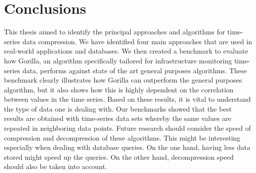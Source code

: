 \chapter*{Conclusions}
This thesis aimed to identify the principal approaches and algorithms for time-series data compression.
We have identified four main approaches that are used in real-world applications and databases.
We then created a benchmark to evaluate how Gorilla, an algorithm specifically tailored for infrastructure
monitoring time-series data, performs against state of the art general purposes algorithms. 
These benchmark clearly illustrates how Gorilla can outperform the general purposes algorithm, but it
also shows how this is highly dependent on the correlation between values in the time series.
Based on these results, it is vital to understand the type of data one is dealing with. Our benchmarks
showed that the best results are obtained with time-series data sets whereby the same values are repeated
in neighboring data points. Future research should consider the speed of compression and decompression of
these algorithms. This might be interesting especially when dealing with database queries. On the one hand,
having less data stored might speed up the queries. On the other hand, decompression speed should also
be taken into account.